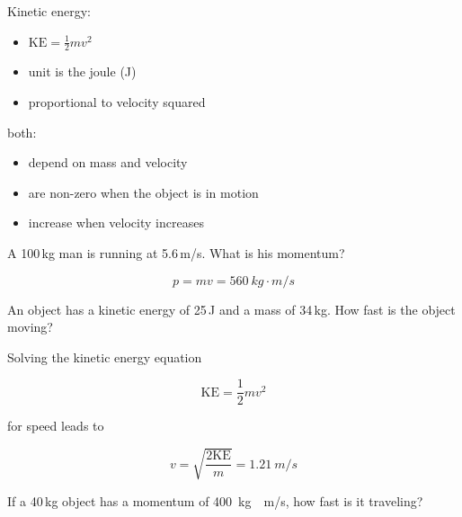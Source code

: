 \documentclass[answers]{exam}
\begin{document}
\begin{questions}
\begin{solution}
\bigskip

Kinetic energy:

\begin{itemize}[itemsep=0pt,topsep=0pt]
    \item $\mathrm{KE} = \frac{1}{2} mv^2$
    \item unit is the joule (J) 
    \item proportional to velocity squared
\end{itemize}

\bigskip

both:

\begin{itemize}[itemsep=0pt,topsep=0pt]
    \item depend on mass and velocity
    \item are non-zero when the object is in motion
    \item increase when velocity increases
\end{itemize}
\end{solution}



\question %
A 100\,kg man is running at 5.6\,m/s. What is his momentum? 

\begin{solution}
\phantom{.}

\begin{equation*}
    p = mv = \boxed{\SI{560}{kg\cdot m/s}}
\end{equation*}
\end{solution}



\question %
An object has a kinetic energy of 25\,J and a mass of 34\,kg. How fast is the object moving? 

\begin{solution}
Solving the kinetic energy equation

\begin{equation*}
    \mathrm{KE} = \frac{1}{2} mv^2
\end{equation*}

for speed leads to

\begin{equation*}
    v = \sqrt{\frac{2\mathrm{KE}}{m}} = \boxed{\SI{1.21}{m/s}}
\end{equation*}
\end{solution}

\question %
If a 40\,kg object has a momentum of \SI{400}{kg\cdot m/s}, how fast is it traveling?


\end{questions}
\end{document}
